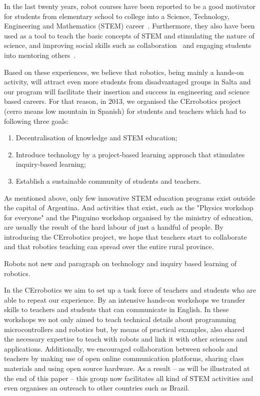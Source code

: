 \documentclass[a4paper]{llncs}
\begin{document}
In the last twenty years, robot courses have been reported to be a good motivator for students from elementary school to college into a Science, Technology, Engineering and Mathematics (STEM) career~\cite{RuizDelSolar2004,R ogers2004, Barak2009, wyffels2010, Nugent2010, wyffels2011, VanDyne2012, Karp2013}.
Furthermore, they also have been used as a tool to teach the basic concepts of STEM and stimulating the nature of science\cite{Rogers2004,Barak2009,wyffels2010,Nugent2010,wyffels2011,Carbajal2011,VanDyne2012,Karp2013}, and improving social skills such as collaboration~\cite{Barak2009,Nugent2010,wyffels2010,wyffels2011} and engaging students into mentoring others~\cite{Karp2013}.

Based on these experiences, we believe that robotics, being mainly a hands-on activity, will attract even more students from disadvantaged groups in Salta and our program will facilitate their insertion and success in engineering and science based careers.
For that reason, in 2013, we organised the CErrobotics project (cerro means low mountain in Spanish) for students and teachers which had to following three goals:
\begin{enumerate}
	\item Decentralisation of knowledge and STEM education;
	\item Introduce technology by a project-based learning approach that stimulates inquiry-based learning;
	\item Establish a sustainable community of students and teachers.
\end{enumerate}

As mentioned above, only few innovative STEM education programs exist outside the capital of Argentina.
And activities that exist, such as the "Physics workshop for everyone" and the Pinguino workshop organised by the ministry of education, are usually the result of the hard labour of just a handful of people.
By introducing the CErrobotics project, we hope that teachers start to collaborate and that robotics teaching can spread over the entire rural province.

Robots not new and paragraph on technology and inquiry based learning of robotics.

In the CErrobotics we aim to set up a task force of teachers and students who are able to repeat our experience.
By an intensive hands-on workshops we transfer skills to teachers and students that can communicate in English.
In these workshops we not only aimed to teach technical details about programming microcontrollers and robotics but, by means of practical examples, also shared the necessary expertise to teach with robots and link it with other sciences and applications.
Additionally, we encouraged collaboration between schools and teachers by making use of open online communication platforms, sharing class materials and using open source hardware.
As a result -- as will be illustrated at the end of this paper --  this group now facilitates all kind of STEM activities and even organises an outreach to other countries such as Brazil.
\end{document}

